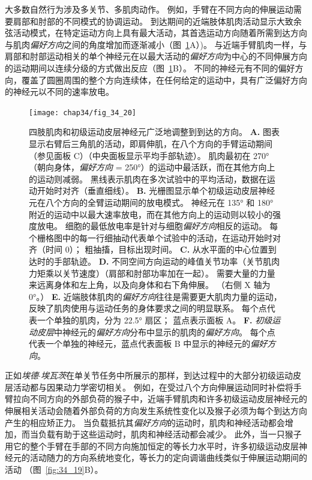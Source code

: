大多数自然行为涉及多关节、多肌肉动作。
例如，手臂在不同方向的伸展运动需要肩部和肘部的不同模式的协调运动。
到达期间的近端肢体肌肉活动显示大致余弦活动模式，在特定运动方向上具有最大活动，其首选运动方向随着所需到达方向与肌肉\textit{偏好方向}之间的角度增加而逐渐减小（图~\ref{fig:34_20}A）)。
与近端手臂肌肉一样，与肩部和肘部运动相关的单个神经元在以最大活动的\textit{偏好方向}为中心的不同伸展方向的运动期间以连续分级的方式做出反应（图~\ref{fig:34_20}B）。
不同的神经元有不同的偏好方向，覆盖了圆圈周围的整个方向连续体，在任何给定的运动中，具有广泛偏好方向的神经元以不同的速率放电。


\begin{figure}[htbp]
	\centering
	\texttt{[image: chap34/fig\_34\_20]}
	\caption{四肢肌肉和初级运动皮层神经元广泛地调整到到达的方向。
		\textbf{A.} 图表显示右臂后三角肌的活动，即肩伸肌，在八个方向的手臂运动期间（参见面板 C）（中央面板显示平均手部轨迹）。
		肌肉最初在 270°（朝向身体，\textit{偏好方向} = 250°）的运动中最活跃，而在其他方向上的运动则减弱。
		黑线表示肌肉在多次试验中的平均活动，数据在运动开始时对齐（垂直细线）。
		\textbf{B.} 光栅图显示单个初级运动皮层神经元在八个方向的全臂运动期间的放电模式。
		神经元在 135° 和 180° 附近的运动中以最大速率放电，而在其他方向上的运动则以较小的强度放电。
		细胞的最低放电率是针对与细胞\textit{偏好方向}相反的运动。
		每个栅格图中的每一行细抽动代表单个试验中的活动，在运动开始时对齐（时间 0）；
		粗抽搐，目标出现时间\cite{georgopoulos1982relations}。
		\textbf{C.} 从水平面的中心位置到达时的手部轨迹。 \textbf{D.} 不同空间方向运动的峰值关节功率（关节肌肉力矩乘以关节速度）（肩部和肘部功率加在一起）。
		需要大量的力量来远离身体和左上角，以及向身体和右下角伸展。 （右侧 X 轴为 0°。）
		\textbf{E.} 近端肢体肌肉的\textit{偏好方向}往往是需要更大肌肉力量的运动，反映了肌肉使用与运动任务的身体要求之间的明显联系。
		每个点代表一个单独的肌肉，分为 22.5° 扇区； 蓝点表示面板 A。 
		\textbf{F.} \textit{初级运动皮层}中神经元的\textit{偏好方向}分布中显示的肌肉的\textit{偏好方向}。
		每个点代表一个单独的神经元，蓝点代表面板 B 中显示的神经元的\textit{偏好方向}\cite{scott2001dissociation}。}
	\label{fig:34_20}
\end{figure}


正如\textit{埃德$\cdot$埃瓦茨}在单关节任务中所展示的那样，到达过程中的大部分初级运动皮层活动都与因果动力学密切相关。
例如，在受过八个方向伸展运动同时补偿将手臂拉向不同方向的外部负荷的猴子中，近端手臂肌肉和许多初级运动皮层神经元的伸展相关活动会随着外部负荷的方向发生系统性变化以及猴子必须为每个到达方向产生的相应矫正力。
当负载抵抗其\textit{偏好方向}的运动时，肌肉和神经活动都会增加，而当负载有助于这些运动时，肌肉和神经活动都会减少。
此外，当一只猴子用它的整个手臂在手部的不同方向施加恒定的等长力水平时，许多初级运动皮层神经元的活动随力的方向系统地变化，等长力的定向调谐曲线类似于伸展运动期间的活动 （图~\ref{fig:34_19}B）。


